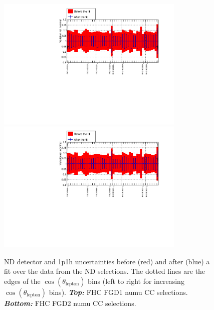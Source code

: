 \begin{figure}[ht]
  \begin{center}
    \includegraphics[width=0.8\textwidth,page=4]{images/BANFF/OutputAsimov_histos.pdf}\\
    \includegraphics[width=0.8\textwidth,page=5]{images/BANFF/OutputAsimov_histos.pdf}
    \caption[ND280 detector and 1p1h uncertainties before and after a
    fit to the Asimov data set of the FHC $\nu_\mu$ ND280
    selections]{\Gls{ND} detector and 1p1h uncertainties before (red)
      and after (blue) a fit over the data from the \Gls{ND}
      selections. The dotted lines are the edges of the
      $\cos(\theta_\text{lepton})$ bins (left to right for increasing
      $\cos(\theta_\text{lepton})$ bins). \textbf{\textit{Top:}}
      \Gls{FHC} \Gls{FGD}1 \Gls{numu} \Gls{CC}
      selections. \textbf{\textit{Bottom:}} \Gls{FHC} \Gls{FGD}2
      \Gls{numu} \Gls{CC} selections.}
    \label{fig:asimovdet1}
  \end{center}
\end{figure}

